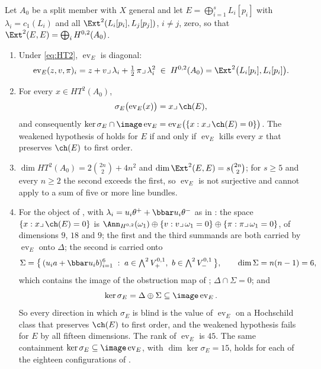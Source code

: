 \begin{proposition}\label{prop:evaluation}
Let $A_{0}$ be a split member with $X$ general and let
$E=\bigoplus_{i=1}^{s}L_{i}[p_{i}]$ with $\lambda_{i}=c_{1}(L_{i})$ and all
$\Ext^{2}(L_{i}[p_{i}],L_{j}[p_{j}])$, $i\ne j$, zero, so that
$\Ext^{2}(E,E)=\bigoplus_{i}H^{0,2}(A_{0})$.
\begin{enumerate}[label=\textup{(\roman*)},nosep]
\item Under \eqref{eq:HT2}, $\operatorname{ev}_{E}$ is diagonal:
  \begin{equation}\label{eq:evsplit}
    \operatorname{ev}_{E}(z,v,\pi)_{i}
    =z+v\lrcorner\,\lambda_{i}+\tfrac12\,\pi\lrcorner\,\lambda_{i}^{2}
    \;\in\;H^{0,2}(A_{0})=\Ext^{2}\bigl(L_{i}[p_{i}],L_{i}[p_{i}]\bigr).
  \end{equation}
\item For every $x\in HT^{2}(A_{0})$,
  \begin{equation}\label{eq:sigmaev}
    \sigma_{E}\bigl(\operatorname{ev}_{E}(x)\bigr)=x\lrcorner\,\ch(E),
  \end{equation}
  and consequently
  $\ker\sigma_{E}\cap\image\operatorname{ev}_{E}
   =\operatorname{ev}_{E}\bigl(\{x:x\lrcorner\,\ch(E)=0\}\bigr)$.
  The weakened hypothesis of \cite[Question 11.4]{Mar25b} holds for $E$ if
  and only if $\operatorname{ev}_{E}$ kills every $x$ that preserves
  $\ch(E)$ to first order.
\item $\dim HT^{2}(A_{0})=2\binom{2n}{2}+4n^{2}$ and
  $\dim\Ext^{2}(E,E)=s\binom{2n}{2}$; for $s\ge5$ and every $n\ge2$ the
  second exceeds the first, so $\operatorname{ev}_{E}$ is not surjective and
  \cite[Lemma 11.3]{Mar25b} cannot apply to a sum of five or more line
  bundles.
\item For the object of , with
  $\lambda_{i}=u_{i}\theta^{+}+\bbar u_{i}\theta^{-}$ as in
  : the space $\{x:x\lrcorner\,\ch(E)=0\}$ is
  $\Ann_{H^{0,2}}(\omega_{1})\oplus\{v:v\lrcorner\,\omega_{1}=0\}\oplus
  \{\pi:\pi\lrcorner\,\omega_{1}=0\}$, of dimensions $9$, $18$ and $9$; the
  first and the third summands are both carried by $\operatorname{ev}_{E}$
  onto $\Delta$; the second is carried onto
  \[
    \Sigma=\bigl\{\,(u_{i}a+\bbar u_{i}b)_{i=1}^{6}\;:\;
      a\in\textstyle\bigwedge^{2}V_{+}^{0,1},\ b\in\bigwedge^{2}V_{-}^{0,1}\,\bigr\},
    \qquad \dim\Sigma=n(n-1)=6,
  \]
  which contains the image of the obstruction map of
  ; $\Delta\cap\Sigma=0$; and
  \[
    \ker\sigma_{E}=\Delta\oplus\Sigma\subseteq\image\operatorname{ev}_{E}.
  \]
  So every direction in which $\sigma_{E}$ is blind is the value of
  $\operatorname{ev}_{E}$ on a Hochschild class that preserves $\ch(E)$ to
  first order, and the weakened hypothesis fails for $E$ by all fifteen
  dimensions. The rank of $\operatorname{ev}_{E}$ is $45$. The same
  containment $\ker\sigma_{E}\subseteq\image\operatorname{ev}_{E}$, with
  $\dim\ker\sigma_{E}=15$, holds for each of the eighteen configurations of
  .
\end{enumerate}
\end{proposition}


